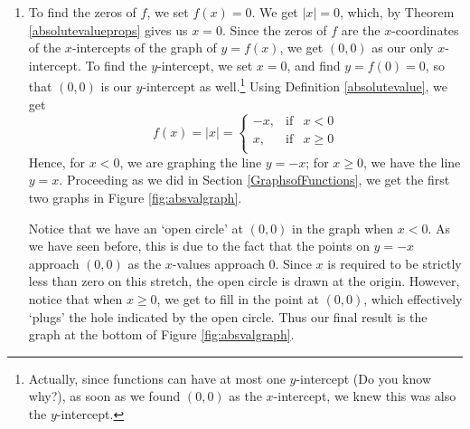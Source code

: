{
\begin{enumerate}

\item  To find the zeros of $f$, we set $f(x)= 0$.  We get $|x|=0$, which, by Theorem \ref{absolutevalueprops} gives us $x=0$.  Since the zeros of $f$ are the $x$-coordinates of the $x$-intercepts of the graph of $y=f(x)$, we get $(0,0)$ as our only $x$-intercept.  To find the $y$-intercept, we set $x=0$, and find $y = f(0) = 0$, so that $(0,0)$ is our $y$-intercept as well.\footnote{Actually, since functions can have at most one $y$-intercept (Do you know why?), as soon as we found $(0,0)$ as the $x$-intercept, we knew this was also the $y$-intercept.}  Using Definition \ref{absolutevalue}, we get \[ f(x) = |x| =  \left\{ \begin{array}{rcl} -x, & \mbox{if} & x < 0  \\ x, & \mbox{if} & x \geq 0 \\ \end{array} \right.\]  Hence, for $x < 0$, we are graphing the line $y = -x$;  for $x \geq 0$, we have the line $y = x$.  Proceeding as we did in Section \ref{GraphsofFunctions}, we get the first two graphs in Figure \ref{fig:absvalgraph}.


\medskip

Notice that we have an `open circle' at $(0,0)$ in the graph when $x<0$. As we have seen before, this is due to the fact that the points on $y = -x$ approach $(0,0)$ as the $x$-values approach $0$.  Since $x$ is required to be strictly less than zero on this stretch, the open circle is drawn at the origin.  However, notice that when $x \geq 0$, we get to fill in the point at $(0,0)$, which effectively `plugs' the hole indicated by the open circle.  Thus our final result is the graph at the bottom of Figure \ref{fig:absvalgraph}.



\end{enumerate}}
